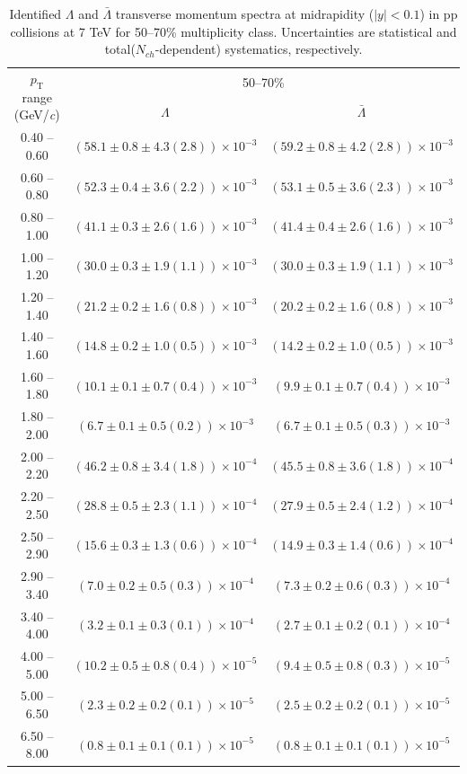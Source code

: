 \begin{table}
\caption{Identified $\Lambda$ and $\bar{\Lambda}$  transverse momentum spectra at midrapidity ($|y|<0.1$) in pp collisions at 7 TeV for 50--70\% multiplicity class. Uncertainties are statistical and total($N_{ch}$-dependent) systematics, respectively.}
\label{tab:Lambda_AntiLambda_50to70}
\begin{center}
\begin{tabular}{ c | c c }
\hline
\multirow{2}{*}{$p_{\mathrm{T}}$ range (GeV/\textit{c})} & \multicolumn{2}{c}{50--70\%} \\ & $\Lambda$& $\bar{\Lambda}$\\ 
\hline
0.40 -- 0.60 & $(58.1\pm0.8\pm4.3(2.8))\times10^{-3}$ & $(59.2\pm0.8\pm4.2(2.8))\times10^{-3}$ \\ 
0.60 -- 0.80 & $(52.3\pm0.4\pm3.6(2.2))\times10^{-3}$ & $(53.1\pm0.5\pm3.6(2.3))\times10^{-3}$ \\ 
0.80 -- 1.00 & $(41.1\pm0.3\pm2.6(1.6))\times10^{-3}$ & $(41.4\pm0.4\pm2.6(1.6))\times10^{-3}$ \\ 
1.00 -- 1.20 & $(30.0\pm0.3\pm1.9(1.1))\times10^{-3}$ & $(30.0\pm0.3\pm1.9(1.1))\times10^{-3}$ \\ 
1.20 -- 1.40 & $(21.2\pm0.2\pm1.6(0.8))\times10^{-3}$ & $(20.2\pm0.2\pm1.6(0.8))\times10^{-3}$ \\ 
1.40 -- 1.60 & $(14.8\pm0.2\pm1.0(0.5))\times10^{-3}$ & $(14.2\pm0.2\pm1.0(0.5))\times10^{-3}$ \\ 
1.60 -- 1.80 & $(10.1\pm0.1\pm0.7(0.4))\times10^{-3}$ & $(9.9\pm0.1\pm0.7(0.4))\times10^{-3}$ \\ 
1.80 -- 2.00 & $(6.7\pm0.1\pm0.5(0.2))\times10^{-3}$ & $(6.7\pm0.1\pm0.5(0.3))\times10^{-3}$ \\ 
2.00 -- 2.20 & $(46.2\pm0.8\pm3.4(1.8))\times10^{-4}$ & $(45.5\pm0.8\pm3.6(1.8))\times10^{-4}$ \\ 
2.20 -- 2.50 & $(28.8\pm0.5\pm2.3(1.1))\times10^{-4}$ & $(27.9\pm0.5\pm2.4(1.2))\times10^{-4}$ \\ 
2.50 -- 2.90 & $(15.6\pm0.3\pm1.3(0.6))\times10^{-4}$ & $(14.9\pm0.3\pm1.4(0.6))\times10^{-4}$ \\ 
2.90 -- 3.40 & $(7.0\pm0.2\pm0.5(0.3))\times10^{-4}$ & $(7.3\pm0.2\pm0.6(0.3))\times10^{-4}$ \\ 
3.40 -- 4.00 & $(3.2\pm0.1\pm0.3(0.1))\times10^{-4}$ & $(2.7\pm0.1\pm0.2(0.1))\times10^{-4}$ \\ 
4.00 -- 5.00 & $(10.2\pm0.5\pm0.8(0.4))\times10^{-5}$ & $(9.4\pm0.5\pm0.8(0.3))\times10^{-5}$ \\ 
5.00 -- 6.50 & $(2.3\pm0.2\pm0.2(0.1))\times10^{-5}$ & $(2.5\pm0.2\pm0.2(0.1))\times10^{-5}$ \\ 
6.50 -- 8.00 & $(0.8\pm0.1\pm0.1(0.1))\times10^{-5}$ & $(0.8\pm0.1\pm0.1(0.1))\times10^{-5}$ \\ 
\hline
\end{tabular}
\end{center}
\end{table}
 
